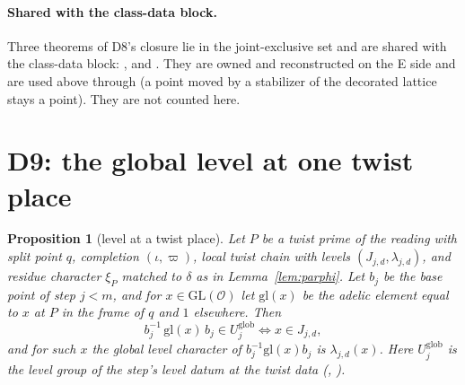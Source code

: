 \documentclass[11pt]{article}
\newcommand{\Ok}{\mathcal O}
\newcommand{\GL}{\mathrm{GL}}
\newtheorem{proposition}[theorem]{Proposition}
\theoremstyle{definition}
\theoremstyle{remark}
\begin{document}
\paragraph{Shared with the class-data block.} Three theorems of D8's closure lie in the joint-exclusive set and are shared with the class-data block: ,  and . They are owned and reconstructed on the E side and are used above through  (a point moved by a stabilizer of the decorated lattice stays a point). They are not counted here.

\section{D9: the global level at one twist place}\label{sec:D9}

\begin{proposition}[level at a twist place]\label{prop:D9}
Let $P$ be a twist prime of the reading with split point $q$, completion $(\iota,\varpi)$, local twist chain with levels $(J_{j,d},\lambda_{j,d})$, and residue character $\xi_P$ matched to $\delta$ as in Lemma~\ref{lem:parphi}. Let $b_j$ be the base point of step $j<m$, and for $x\in\GL(\Ok)$ let $\mathrm{gl}(x)$ be the adelic element equal to $x$ at $P$ in the frame of $q$ and $1$ elsewhere. Then
\[
b_j^{-1}\,\mathrm{gl}(x)\,b_j\in U^{\mathrm{glob}}_j\iff x\in J_{j,d},
\]
and for such $x$ the global level character of $b_j^{-1}\mathrm{gl}(x)b_j$ is $\lambda_{j,d}(x)$. Here $U^{\mathrm{glob}}_j$ is the level group of the step's level datum at the twist data (, ).
\end{proposition}
\end{document}
